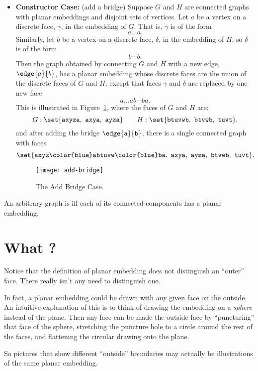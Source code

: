 \begin{definition}
\begin{itemize}
\item \textbf{Constructor Case:} (add a bridge) Suppose $G$ and $H$ are
connected graphs with planar embeddings and disjoint sets of vertices.
Let $a$ be a vertex on a discrete face, $\gamma$, in the embedding of
$G$.  That is, $\gamma$ is of the form
\[
a\dots a.
\]
Similarly, let $b$ be a vertex on a discrete face, $\delta$, in the
embedding of $H$, so $\delta$ is of the form
\[
b\cdots b.
\]
Then the graph obtained by connecting $G$ and $H$ with a new edge,
$\edge{a}{b}$, has a planar embedding whose discrete faces are the union of
the discrete faces of $G$ and $H$, except that faces $\gamma$ and $\delta$
are replaced by one new face
\[
a\dots ab\cdots ba.
\]
This is illustrated in Figure~\ref{fig:add-bridge}, where the faces of
$G$ and $H$ are:
\[
G: \set{\texttt{axyza},\ \texttt{axya},\ \texttt{ayza}}
    \qquad H: \set{\texttt{btuvwb},\ \texttt{btvwb},\ \texttt{tuvt}},
\]
and after adding the bridge $\edge{\texttt{a}}{\texttt{b}}$, there is a
single connected graph with faces
\[
\set{\texttt{axyz{\color{blue}ab}tuvw{\color{blue}ba}},\ 
         \texttt{axya},\ \texttt{ayza},\ \texttt{btvwb},\ \texttt{tuvt}}.
\]
\begin{figure}[h]
\centering \texttt{[image: add-bridge]}
\caption{The Add Bridge Case.}
\label{fig:add-bridge}
\end{figure}

\end{itemize}

An arbitrary graph is  iff each of its connected components
has a planar embedding.

\end{definition}

\section{What ?}
Notice that the definition of planar embedding does not distinguish an
``outer'' face.  There really isn't any need to distinguish one.

In fact, a planar embedding could be drawn with any given face on the
outside.  An intuitive explanation of this is to think of drawing the
embedding on a \emph{sphere} instead of the plane.  Then any face can be
made the outside face by ``puncturing'' that face of the sphere,
stretching the puncture hole to a circle around the rest of the faces,
and flattening the circular drawing onto the plane.

So pictures that show different ``outside'' boundaries may actually be
illustrations of the same planar embedding.

